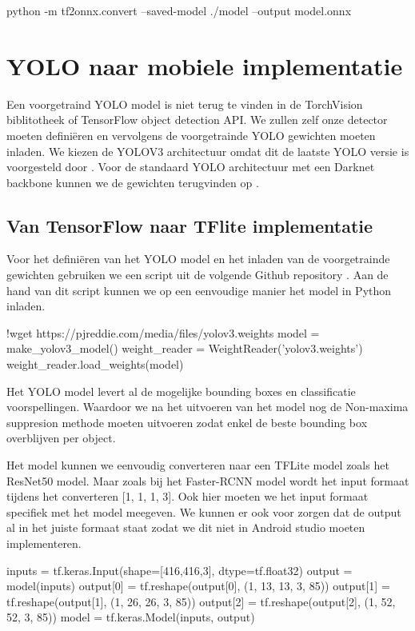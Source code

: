 \begin{python}
python -m tf2onnx.convert --saved-model ./model --output model.onnx
\end{python}

\section{YOLO naar mobiele implementatie}
Een voorgetraind YOLO model is niet terug te vinden in de TorchVision biblitotheek of TensorFlow object detection API.
We zullen zelf onze detector moeten defini\"eren en vervolgens de voorgetrainde YOLO gewichten moeten inladen.
We kiezen de YOLOV3 architectuur omdat dit de laatste YOLO versie is voorgesteld door \cite{redmon_yolov3_2018}.
Voor de standaard YOLO architectuur met een Darknet backbone kunnen we de gewichten terugvinden op \cite{darknet13} .

\subsection{Van TensorFlow naar TFlite implementatie}
Voor het defini\"eren van het YOLO model en het inladen van de voorgetrainde gewichten gebruiken we een script uit de volgende Github repository \cite{anh_yolo3_2021}.
Aan de hand van dit script kunnen we op een eenvoudige manier het model in Python inladen.

\begin{python}
!wget https://pjreddie.com/media/files/yolov3.weights
model = make_yolov3_model()
weight_reader = WeightReader('yolov3.weights')
weight_reader.load_weights(model)
\end{python}

Het YOLO model levert al de mogelijke bounding boxes en classificatie voorspellingen.
Waardoor we na het uitvoeren van het model nog de Non-maxima suppresion methode moeten uitvoeren zodat enkel de beste bounding box overblijven per object.

Het model kunnen we eenvoudig converteren naar een TFLite model zoals het ResNet50 model.
Maar zoals bij het Faster-RCNN model wordt het input formaat tijdens het converteren [1, 1, 1, 3].
Ook hier moeten we het input formaat specifiek met het model meegeven.
We kunnen er ook voor zorgen dat de output al in het juiste formaat staat zodat we dit niet in Android studio moeten implementeren.

\begin{python}
inputs = tf.keras.Input(shape=[416,416,3], dtype=tf.float32)
output = model(inputs)
output[0] =  tf.reshape(output[0], (1, 13, 13, 3, 85))
output[1] =  tf.reshape(output[1], (1, 26, 26, 3, 85))
output[2] =  tf.reshape(output[2], (1, 52, 52, 3, 85))
model = tf.keras.Model(inputs, output)
\end{python}

